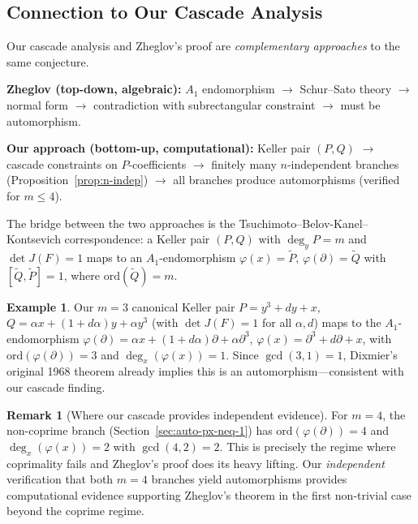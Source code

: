 \documentclass[12pt,a4paper]{article}
\theoremstyle{definition}
\newtheorem{example}[theorem]{Example}
\newtheorem{remark}[theorem]{Remark}
\begin{document}
\subsection{Connection to Our Cascade Analysis}

Our cascade analysis and Zheglov's proof are \emph{complementary
approaches} to the same conjecture.

\medskip\noindent
\textbf{Zheglov (top-down, algebraic):}
$A_1$ endomorphism $\to$ Schur--Sato theory $\to$ normal form $\to$
contradiction with subrectangular constraint $\to$ must be
automorphism.

\medskip\noindent
\textbf{Our approach (bottom-up, computational):} Keller pair
$(P, Q)$ $\to$ cascade constraints on $P$-coefficients $\to$ finitely
many $n$-independent branches (Proposition~\ref{prop:n-indep}) $\to$
all branches produce automorphisms (verified for $m \leq 4$).

\medskip

The bridge between the two approaches is the Tsuchimoto--Belov-Kanel--Kontsevich
correspondence: a Keller pair $(P, Q)$ with $\deg_y P = m$ and $\det
J(F) = 1$ maps to an $A_1$-endomorphism $\varphi(x) = \widetilde{P},\,
\varphi(\partial) = \widetilde{Q}$ with $[\widetilde{Q},
\widetilde{P}] = 1$, where $\mathrm{ord}(\widetilde{Q}) = m$.

\begin{example}
Our $m = 3$ canonical Keller pair $P = y^3 + dy + x$,
$Q = \alpha x + (1 + d\alpha)y + \alpha y^3$ (with $\det J(F) = 1$
for all $\alpha, d$) maps to the $A_1$-endomorphism
$\varphi(\partial) = \alpha x + (1+d\alpha)\partial + \alpha\partial^3$,
$\varphi(x) = \partial^3 + d\partial + x$,
with $\mathrm{ord}(\varphi(\partial)) = 3$ and $\deg_x(\varphi(x)) = 1$.
Since $\gcd(3, 1) = 1$, Dixmier's original 1968 theorem already
implies this is an automorphism---consistent with our cascade finding.
\end{example}

\begin{remark}[Where our cascade provides independent evidence]
\label{rem:cascade-zheglov}
For $m = 4$, the non-coprime branch (Section~\ref{sec:auto-px-neq-1})
has $\mathrm{ord}(\varphi(\partial)) = 4$ and $\deg_x(\varphi(x)) = 2$
with $\gcd(4, 2) = 2$. This is precisely the regime where coprimality
fails and Zheglov's proof does its heavy lifting. Our \emph{independent}
verification that both $m = 4$ branches yield automorphisms provides
computational evidence supporting Zheglov's theorem in the first
non-trivial case beyond the coprime regime.
\end{remark}
\end{document}
